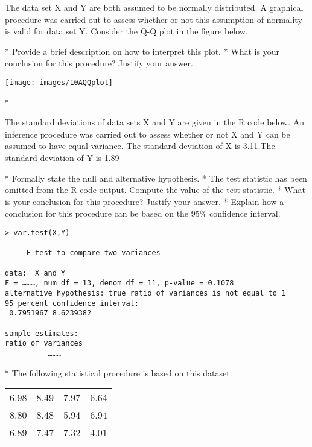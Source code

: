 
The data set X and Y are both assumed to be normally distributed. A graphical procedure was carried out to assess whether or not this assumption of normality is valid for data set Y. Consider the Q-Q plot in the figure below.
\begin{enumerate}[(a)]
*  Provide a brief description on how to interpret this plot.
*  What is your conclusion for this procedure? Justify your answer.
\end{enumerate}


\begin{center}
\texttt{[image: images/10AQQplot]}
\end{center}


    * 

The standard deviations of data sets X and Y are given in the R code below. 
An inference procedure was carried out to assess whether or not X and Y can be assumed to have equal variance.
The standard deviation of X is 3.11.The standard deviation of Y is 1.89

\begin{enumerate}[(i)]
*  Formally state the null and alternative hypothesis.
*  The test statistic has been omitted from the R code output. Compute the value of the test statistic.
*  What is your conclusion for this procedure? Justify your answer.
*  Explain how a conclusion for this procedure can be based on the 95\% confidence interval.
\end{enumerate}
\begin{framed}
\begin{verbatim}
> var.test(X,Y)

     F test to compare two variances

data:  X and Y 
F = ………, num df = 13, denom df = 11, p-value = 0.1078
alternative hypothesis: true ratio of variances is not equal to 1 
95 percent confidence interval:
 0.7951967 8.6239382 

sample estimates:
ratio of variances 
          ……… 
\end{verbatim}
\end{framed}


*  
The following statistical procedure is based on this dataset.
\begin{center}
\begin{tabular}{|cccc|}
\hline
6.98 &8.49 &7.97& 6.64\\
8.80 &8.48 &5.94& 6.94\\
6.89 &7.47 &7.32& 4.01\\
\hline
\end{tabular}
\end{center}

